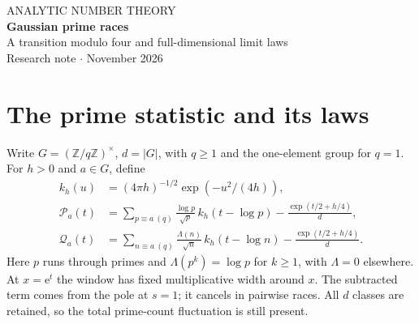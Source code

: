 \documentclass[11pt,letterpaper]{article}
\newcommand{\e}{\mathrm e}\newcommand{\dd}{\,\mathrm d}
\newcommand{\PP}{\mathcal P}\newcommand{\QQ}{\mathcal Q}
\begin{document}
\begin{center}
{\small\textsf{\textcolor{inkblue}{ANALYTIC NUMBER THEORY}}}\\[8pt]
{\huge\bfseries Gaussian prime races}\\[6pt]
{\large A transition modulo four and full-dimensional limit laws}\\[8pt]
{\small Research note \quad$\cdot$ November 2026}
\end{center}
\begin{abstract}
Count primes in a moving Gaussian window on the logarithmic axis, weighting each prime by \((\log p)/\sqrt p\). We prove that the race between the classes \(3\) and \(1\) modulo \(4\) has a unique critical smoothing time in the certified interval \((0.04007656562,0.04007656609)\). Below it each class leads with positive logarithmic density. Above it the class \(3\) leads at every sufficiently large scale. At the threshold the class \(3\) leads with logarithmic density one. For arbitrary moduli we classify the transitions for every pair of classes by their limiting mean. Distinct inverse classes each win with density one half for every width. Every nonzero real projection has a limiting density and a uniform local occupation bound. For \(d=\varphi(q)\), adding the vectors at \(d\) distinct log-scales \(n^{\alpha_j}\), \(1<\alpha_j<2\), gives a single sequence with a limiting density in \(L^{1+\delta}(\mathbb R^d)\). The number-theoretic input is Dirichlet GRH. Multiplicities, coincidences, and rational relations among zero ordinates are allowed.
\end{abstract}

\section{The prime statistic and its laws}
Write \(G=(\mathbb Z/q\mathbb Z)^\times\), \(d=|G|\), with \(q\ge1\) and the one-element group for \(q=1\). For \(h>0\) and \(a\in G\), define
\begin{align}
 k_h(u)&=(4\pi h)^{-1/2}\exp(-u^2/(4h)),\nonumber\\
 \PP_a(t)&=\sum_{p\equiv a\ (q)}\frac{\log p}{\sqrt p}\,k_h(t-\log p)
                  -\frac{\exp(t/2+h/4)}{d},\label{eq:P}\\
 \QQ_a(t)&=\sum_{n\equiv a\ (q)}\frac{\Lambda(n)}{\sqrt n}\,k_h(t-\log n)
                  -\frac{\exp(t/2+h/4)}{d}.\label{eq:Q}
\end{align}
Here \(p\) runs through primes and \(\Lambda(p^k)=\log p\) for \(k\ge1\), with \(\Lambda=0\) elsewhere. At \(x=\e^t\) the window has fixed multiplicative width around \(x\). The subtracted term comes from the pole at \(s=1\); it cancels in pairwise races. All \(d\) classes are retained, so the total prime-count fluctuation is still present.
\end{document}
